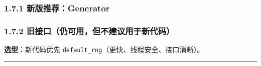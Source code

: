 \subsubsection{1.7.1
新版推荐：Generator}\label{ux65b0ux7248ux63a8ux8350generator}

\begin{Shaded}
\begin{Highlighting}[]
\OperatorTok{=}\NormalTok{)      }
\NormalTok{, }\NormalTok{))                   }\CommentTok{\# [0,1) 均匀}
\NormalTok{, }\OperatorTok{=}\NormalTok{)          }\CommentTok{\# 整数 [1,10)}
\OperatorTok{{-}}\NormalTok{, }\OperatorTok{=}\NormalTok{)           }
\NormalTok{, }\OperatorTok{=}\NormalTok{)           }
\end{Highlighting}
\end{Shaded}

\subsubsection{1.7.2
旧接口（仍可用，但不建议用于新代码）}\label{ux65e7ux63a5ux53e3ux4ecdux53efux7528ux4f46ux4e0dux5efaux8baeux7528ux4e8eux65b0ux4ee3ux7801}

\begin{Shaded}
\begin{Highlighting}[]
\NormalTok{)}
\NormalTok{, }\NormalTok{)     }\CommentTok{\# [0,1)}
\NormalTok{, }\NormalTok{) }
\NormalTok{)       }
\NormalTok{, }\NormalTok{, }\NormalTok{)}
\end{Highlighting}
\end{Shaded}

\textbf{选型}：新代码优先
\texttt{default\_rng}（更快、线程安全、接口清晰）。

\begin{center}\rule{0.5\linewidth}{0.5pt}\end{center}

